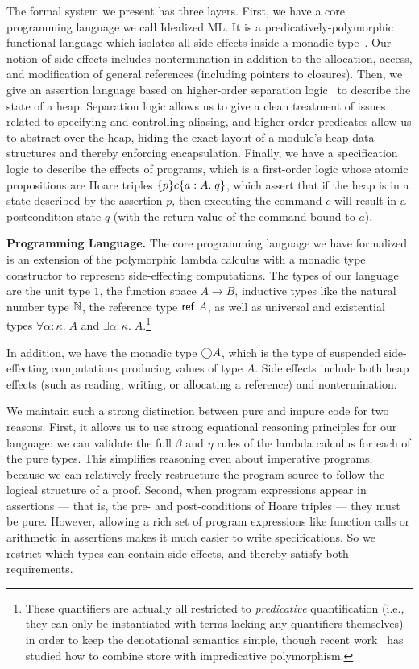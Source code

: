 \documentclass[preprint,natbib]{sigplanconf}
\begin{document}
The formal system we present has three layers. First, we have a core
programming language we call Idealized ML. It is a
predicatively-polymorphic functional language which isolates all side
effects inside a monadic type~\cite{pfenning-davies}. Our notion of
side effects includes nontermination in addition to the allocation,
access, and modification of general references (including pointers to
closures).  Then, we give an assertion language based on higher-order
separation logic~\cite{hosl} to describe the state of a
heap. Separation logic allows us to give a clean treatment of issues
related to specifying and controlling aliasing, and higher-order
predicates allow us to abstract over the heap, hiding the exact layout
of a module's heap data structures and thereby enforcing
encapsulation.  Finally, we have a specification logic to describe the
effects of programs, which is a first-order logic whose atomic
propositions are Hoare triples $\{{p}\}{c}\{{a:A}.\;{q}\}$, which assert
that if the heap is in a state described by the assertion $p$, then
executing the command $c$ will result in a postcondition state $q$
(with the return value of the command bound to $a$).


\textbf{Programming Language.} The core programming language we have
formalized is an extension of the polymorphic lambda calculus with a
monadic type constructor to represent side-effecting computations.
The types of our language are the unit type $1$, the function space $A
\to B$, inductive types like the natural number type $\mathbb{N}$, the reference type
$\mbox{\textsf{{ref }}}A$, as well as universal and existential types $\forall
\alpha:\kappa.\;A$ and $\exists \alpha:\kappa.\;A$.\footnote{These
  quantifiers are actually all restricted to \emph{predicative}
  quantification (i.e., they can only be instantiated with terms
  lacking any quantifiers themselves) in order to keep the
  denotational semantics simple, though recent
  work~\cite{birkedal-impred} has studied how to combine store with
  impredicative polymorphism.}

In addition, we have the monadic type $\bigcirc{A}$, which is the type
of suspended side-effecting computations producing values of type
$A$. Side effects include both heap effects (such as reading, writing,
or allocating a reference) and nontermination.

We maintain such a strong distinction between pure and impure code for
two reasons. First, it allows us to use strong equational
reasoning principles for our language: we can validate the full
$\beta$ and $\eta$ rules of the lambda calculus for each of the pure
types. This simplifies reasoning even about imperative programs,
because we can relatively freely restructure the program source to
follow the logical structure of a proof. Second, when program
expressions appear in assertions --- that is, the pre- and
post-conditions of Hoare triples --- they must be pure. However,
allowing a rich set of program expressions like function calls or
arithmetic in assertions makes it much easier to write
specifications. So we restrict which types can contain side-effects,
and thereby satisfy both requirements.
\end{document}
